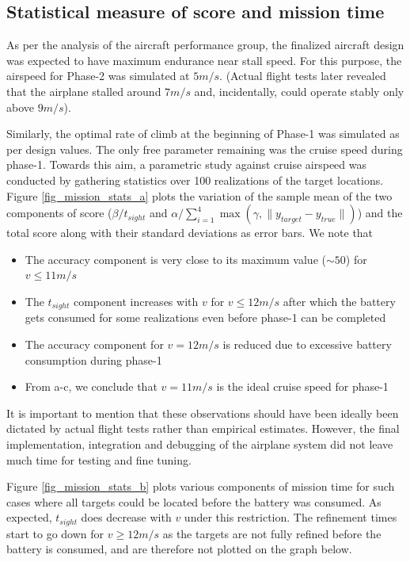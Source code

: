 \subsection{Statistical measure of score and mission time}

As per the analysis of the aircraft performance group, the finalized aircraft design was expected to have maximum endurance near stall speed. For this purpose, the airspeed for Phase-2 was simulated at $5m/s$. (Actual flight tests later revealed that the airplane stalled around $7m/s$ and, incidentally, could operate stably only above $9m/s$). 

Similarly, the optimal rate of climb at the beginning of Phase-1 was simulated as per design values. The only free parameter remaining was the cruise speed during phase-1. Towards this aim, a parametric study against cruise airspeed was conducted by gathering statistics over 100 realizations of the target locations.
Figure \ref{fig_mission_stats_a} plots the variation of the sample mean of the two components of score ($\beta/t_{sight}$ and $\alpha/ \sum_{i=1}^4 \max(\gamma, \|y_{target} - y_{true} \|)$) and the total score along with their standard deviations as error bars. We note that

\begin{itemize}
\item The accuracy component is very close to its maximum value ($\sim 50$) for $v\leq 11m/s$
\item The $t_{sight}$ component increases with $v$ for $v \leq 12 m/s$ after which the battery gets consumed for some realizations even before phase-1 can be completed
\item The accuracy component for $v=12 m/s$ is reduced due to excessive battery consumption during phase-1
\item From a-c, we conclude that $v = 11m/s$ is the ideal cruise speed for phase-1
\end{itemize}

It is important to mention that these observations should have been ideally been dictated by actual flight tests rather than empirical estimates. However, the final implementation, integration and debugging of the airplane system did not leave much time for testing and fine tuning.

Figure \ref{fig_mission_stats_b} plots various components of mission time for such cases where all targets could be located before the battery was consumed. As expected, $t_{sight}$ does decrease with $v$ under this restriction. The refinement times start to go down for $v \geq 12 m/s$ as the targets are not fully refined before the battery is consumed, and are therefore not plotted on the graph below.

